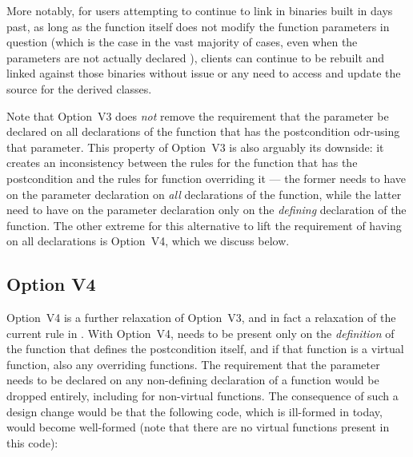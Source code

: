 More notably, for users attempting to continue to link in binaries built in days past, as long as the function itself does not modify the function parameters in question (which is the case in the vast majority of cases, even when the parameters are not actually declared ), clients can continue to be rebuilt and linked against those binaries without issue or any need to access and update the source for the derived classes.

Note that Option~V3 does \emph{not} remove the requirement that the parameter be declared  on all declarations of the function that has the postcondition odr-using that parameter. This property of Option~V3 is also arguably its downside: it creates an inconsistency between the rules for the function that has the postcondition and the rules for function overriding it --- the former needs to have  on the parameter declaration on \emph{all} declarations of the function, while the latter need to have  on the parameter declaration only on the \emph{defining} declaration of the function. The other extreme for this alternative to lift the requirement of having  on all declarations is Option~V4, which we discuss below.

\subsection*{Option V4}

Option~V4 is a further relaxation of Option~V3, and in fact a relaxation of the current rule in \cite{P2900R10}. With Option~V4,  needs to be present only on the \emph{definition} of the function that defines the postcondition itself, and if that function is a virtual function, also any overriding functions. The requirement that the parameter needs to be declared  on any non-defining declaration of a function would be dropped entirely, including for non-virtual functions. The consequence of such a design change would be that the following code, which is ill-formed in \cite{P2900R10} today, would become well-formed (note that there are no virtual functions present in this code):

\pagebreak

